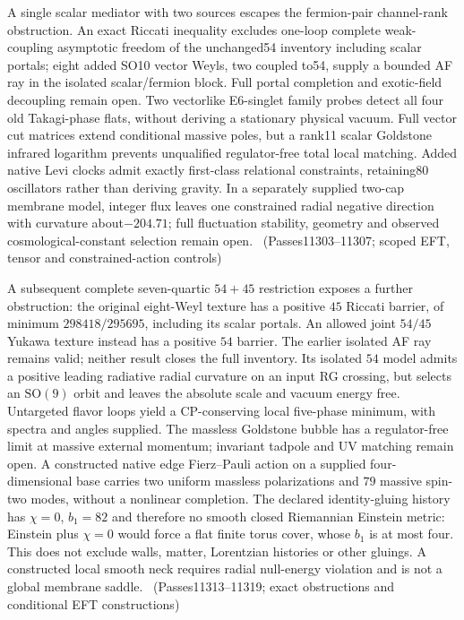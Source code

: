 A single scalar mediator with two sources escapes the fermion-pair channel-rank
obstruction. An exact Riccati inequality excludes one-loop complete weak-coupling
asymptotic freedom of the unchanged54 inventory including scalar portals; eight
added SO10 vector Weyls, two coupled to54, supply a bounded AF ray in the isolated
scalar/fermion block. Full portal completion and exotic-field decoupling remain
open. Two vectorlike E6-singlet family probes detect all four old Takagi-phase
flats, without deriving a stationary physical vacuum. Full vector cut matrices
extend conditional massive poles, but a rank11 scalar Goldstone infrared
logarithm prevents unqualified regulator-free total local matching. Added native
Levi clocks admit exactly first-class relational constraints, retaining80
oscillators rather than deriving gravity. In a separately supplied two-cap
membrane model, integer flux leaves one constrained radial negative direction
with curvature about$-204.71$; full fluctuation stability, geometry and observed
cosmological-constant selection remain open.
\tierC\ (Passes11303--11307; scoped EFT, tensor and constrained-action controls)

A subsequent complete seven-quartic $54+45$ restriction exposes a further
obstruction: the original eight-Weyl texture has a positive $45$ Riccati
barrier, of minimum $298418/295695$, including its scalar portals. An allowed
joint $54/45$ Yukawa texture instead has a positive $54$ barrier. The earlier
isolated AF ray remains valid; neither result closes the full inventory.
Its isolated $54$ model admits a positive leading radiative radial curvature
on an input RG crossing, but selects an $\mathrm{SO}(9)$ orbit and leaves the
absolute scale and vacuum energy free. Untargeted flavor loops yield a
CP-conserving local five-phase minimum, with spectra and angles supplied.
The massless Goldstone bubble has a regulator-free limit at massive external
momentum; invariant tadpole and UV matching remain open. A constructed native
edge Fierz--Pauli action on a supplied four-dimensional base carries two uniform
massless polarizations and $79$ massive spin-two modes, without a nonlinear
completion. The declared identity-gluing history has $\chi=0$, $b_1=82$ and
therefore no smooth closed Riemannian Einstein metric: Einstein plus $\chi=0$
would force a flat finite torus cover, whose $b_1$ is at most four. This does
not exclude walls, matter, Lorentzian histories or other gluings. A constructed
local smooth neck requires radial null-energy violation and is not a global
membrane saddle.
\tierC\ (Passes11313--11319; exact obstructions and conditional EFT constructions)

